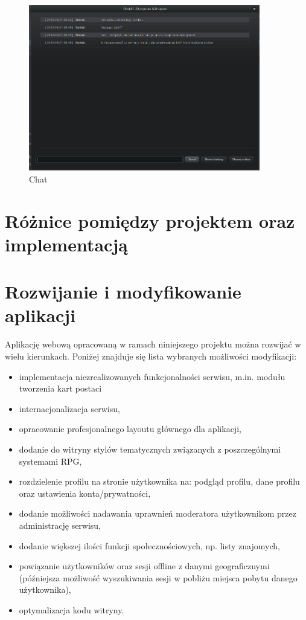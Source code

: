 \begin{figure}[h!]	
\centering
\includegraphics[width=0.9\textwidth]{./img/interfejsy/chat}
\caption{Chat}
\label{fig:faq}
\end{figure}


\clearpage
\section{Różnice pomiędzy projektem oraz implementacją}
\label{sec:roznice}



\section{Rozwijanie i modyfikowanie aplikacji}
\label{sec:rozwoj}

\hspace{15pt}Aplikację webową opracowaną w ramach niniejszego projektu można rozwijać w wielu kierunkach. Poniżej znajduje się lista wybranych możliwości modyfikacji:
\begin{itemize}
\item implementacja niezrealizowanych funkcjonalności serwisu, m.in. modułu tworzenia kart postaci
\item internacjonalizacja serwisu,
\item opracowanie profesjonalnego layoutu głównego dla aplikacji,
\item dodanie do witryny stylów tematycznych związanych z poszczególnymi systemami RPG,
\item rozdzielenie profilu na stronie użytkownika na: podgląd profilu, dane profilu oraz ustawienia konta/prywatności,
\item dodanie możliwości nadawania uprawnień moderatora użytkownikom przez administrację serwisu,
\item dodanie większej ilości funkcji społecznościowych, np. listy znajomych,
\item powiązanie użytkowników oraz sesji offline z danymi geograficznymi (późniejsza możliwość wyszukiwania sesji w pobliżu miejsca pobytu danego użytkownika),
\item optymalizacja kodu witryny.
\end{itemize}

